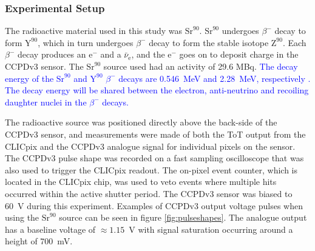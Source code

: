 
\subsubsection{Experimental Setup}
The radioactive material used in this study was $\text{Sr}^{90}$.  $\text{Sr}^{90}$ undergoes $\beta^{-}$ decay to form $\text{Y}^{90}$, which in turn undergoes $\beta^{-}$ decay to form the stable isotope $\text{Z}^{90}$.  Each $\beta^{-}$ decay produces an $\text{e}^{-}$ and a $\bar{\nu}_{\text{e}}$, and the $\text{e}^{-}$ goes on to deposit charge in the CCPDv3 sensor.  The $\text{Sr}^{90}$ source used had an activity of 29.6 MBq.  \textcolor{blue}{The decay energy of the $\text{Sr}^{90}$ and $\text{Y}^{90}$ $\beta^{-}$ decays are 0.546~MeV and 2.28~MeV, respectively \cite{radiationhandbook}.  The decay energy will be shared between the electron, anti-neutrino and recoiling daughter nuclei in the $\beta^{-}$ decays.}

The radioactive source was positioned directly above the back-side of the CCPDv3 sensor, and measurements were made of both the ToT output from the CLICpix and the CCPDv3 analogue signal for individual pixels on the sensor.  The CCPDv3 pulse shape was recorded on a fast sampling oscilloscope that was also used to trigger the CLICpix readout.  The on-pixel event counter, which is located in the CLICpix chip, was used to veto events where multiple hits occurred within the active shutter period.  The CCPDv3 sensor was biased to 60~V during this experiment.  Examples of CCPDv3 output voltage pulses when using the $\text{Sr}^{90}$ source can be seen in figure \ref{fig:pulseshapes}.  The analogue output has a baseline voltage of $\approx 1.15$~V with signal saturation occurring around a height of 700~mV.  

